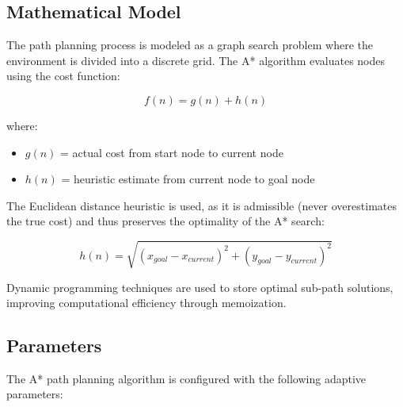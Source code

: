 \subsection{Mathematical Model}
\label{subsec:astar_math_model}

The path planning process is modeled as a graph search problem where the environment is divided into a discrete grid. The A* algorithm evaluates nodes using the cost function:

\begin{equation}
	f(n) = g(n) + h(n)
	\label{eq:astar_cost}
\end{equation}

where:
\begin{itemize}[noitemsep]
	\item $g(n)$ = actual cost from start node to current node
	\item $h(n)$ = heuristic estimate from current node to goal node
\end{itemize}

The Euclidean distance heuristic is used, as it is admissible (never overestimates the true cost) and thus preserves the optimality of the A* search:

\begin{equation}
	h(n) = \sqrt{(x_{goal} - x_{current})^2 + (y_{goal} - y_{current})^2}
	\label{eq:euclidean_heuristic_p1}
\end{equation}

Dynamic programming techniques are used to store optimal sub-path solutions, improving computational efficiency through memoization.

\subsection{Parameters}
\label{subsec:astar_parameters}

The A* path planning algorithm is configured with the following adaptive parameters:

